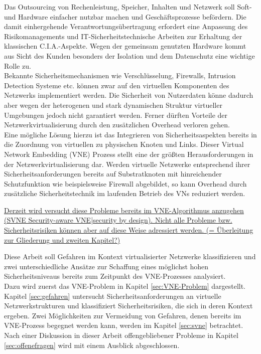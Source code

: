 Das Outsourcing von Rechenleistung, Speicher, Inhalten und Netzwerk soll Soft- und Hardware einfacher nutzbar machen und Geschäftsprozesse befördern. Die damit einhergehende Verantwortungsübertragung erfordert eine Anpassung des Risikomanagements und IT-Sicherheitstechnische Arbeiten zur Erhaltung der klassischen C.I.A.-Aspekte. Wegen der gemeinsam genutzten Hardware kommt aus Sicht des Kunden besonders der Isolation und dem Datenschutz eine wichtige Rolle zu.\\
Bekannte Sicherheitsmechanismen wie Verschlüsselung, Firewalls, Intrusion Detection Systeme etc. können zwar auf den virtuellen Komponenten des Netzwerks implementiert werden. Die Sicherheit von Nutzerdaten könne dadurch aber wegen der heterogenen und stark dynamischen Struktur virtueller Umgebungen jedoch nicht garantiert werden. Ferner dürften Vorteile der Netzwerkvirtualisierung durch den zusätzlichen Overhead verloren gehen. \cite{gong2016virtual}\\
Eine mögliche Lösung hierzu ist das Integrieren von Sicherheitsaspekten bereits in die Zuordnung von virtuellen zu physischen Knoten und Links. Dieser Virtual Network Embedding (VNE) Prozess stellt eine der größten Herausforderungen in der Netzwerkvirtualisierung dar. \cite{fischer2013virtual}
Werden virtuelle Netzwerke entsprechend ihrer Sicherheitsanforderungen bereits auf Substratknoten mit hinreichender Schutzfunktion wie beispielsweise Firewall abgebildet, so kann Overhead durch zusätzliche Sicherheitstechnik im laufenden Betrieb des VNs reduziert werden.

\underline{Derzeit wird versucht \cite{bays2012security, gong2016virtual, wang2016towards} diese Probleme bereits im VNE-Algorithmus anzugehen (SVNE Security-aware VNE|security by design). Nicht alle Probleme bzw. Sicherheitsrisiken können aber auf diese Weise adressiert werden. (= Überleitung zur Gliederung und zweiten Kapitel?)}


Diese Arbeit soll Gefahren im Kontext virtualisierter Netzwerke klassifizieren und zwei unterschiedliche Ansätze zur Schaffung eines möglichst hohen Sicherheitsniveaus bereits zum Zeitpunkt des VNE-Prozesses analysiert.\\
Dazu wird zuerst das VNE-Problem in Kapitel \ref{sec:VNE-Problem} \textit{} dargestellt. Kapitel \ref{sec:gefahren} \textit{} untersucht Sicherheitsanforderungen an virtuelle Netzwerkstrukturen und klassifiziert Sicherheitsrisiken, die sich in deren Kontext ergeben. Zwei Möglichkeiten zur Vermeidung von Gefahren, denen bereits im VNE-Prozess begegnet werden kann, werden im Kapitel \ref{sec:svne} \textit{} betrachtet. Nach einer Diskussion in dieser Arbeit offengebliebener Probleme in Kapitel \ref{sec:offenefragen} \textit{} wird mit einem Ausblick abgeschlossen.
